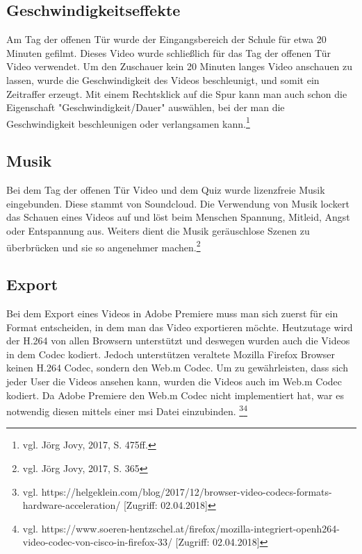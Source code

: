 \subsection{Geschwindigkeitseffekte}
Am Tag der offenen Tür wurde der Eingangsbereich der Schule für etwa 20 Minuten gefilmt. Dieses Video wurde schließlich für das Tag der offenen Tür Video verwendet. Um den Zuschauer kein 20 Minuten langes Video anschauen zu lassen, wurde die Geschwindigkeit des Videos beschleunigt, und somit ein Zeitraffer erzeugt. Mit einem Rechtsklick auf die Spur kann man auch schon die Eigenschaft "Geschwindigkeit/Dauer" auswählen, bei der man die Geschwindigkeit beschleunigen oder verlangsamen kann.\footnote{vgl. Jörg Jovy, 2017, S. 475ff.}
\subsection{Musik}
Bei dem Tag der offenen Tür Video und dem Quiz wurde lizenzfreie Musik eingebunden. Diese stammt von Soundcloud. Die Verwendung von Musik lockert das Schauen eines Videos auf und löst beim Menschen Spannung, Mitleid, Angst oder Entspannung aus. Weiters dient die Musik geräuschlose Szenen zu überbrücken und sie so angenehmer machen.\footnote{vgl. Jörg Jovy, 2017, S. 365}
\subsection{Export}
Bei dem Export eines Videos in Adobe Premiere muss man sich zuerst für ein Format entscheiden, in dem man das Video exportieren möchte. Heutzutage wird der H.264 von allen Browsern unterstützt und deswegen wurden auch die Videos in dem Codec kodiert. Jedoch unterstützen veraltete Mozilla Firefox Browser keinen H.264 Codec, sondern den Web.m Codec. Um zu gewährleisten, dass sich jeder User die Videos ansehen kann, wurden die Videos auch im Web.m Codec kodiert. Da Adobe Premiere den Web.m Codec nicht implementiert hat, war es notwendig diesen mittels einer msi Datei einzubinden. \footnote{vgl. https://helgeklein.com/blog/2017/12/browser-video-codecs-formats-hardware-acceleration/ [Zugriff: 02.04.2018]}\footnote{vgl. https://www.soeren-hentzschel.at/firefox/mozilla-integriert-openh264-video-codec-von-cisco-in-firefox-33/ [Zugriff: 02.04.2018]}